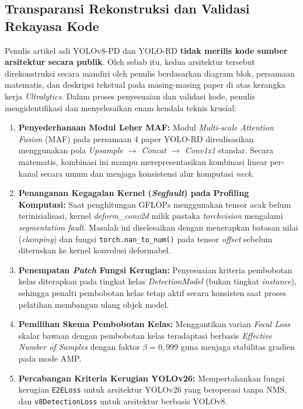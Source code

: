 \subsection{Transparansi Rekonstruksi dan Validasi Rekayasa Kode}
\label{subsec:validasi_kode}
Penulis artikel asli YOLOv8-PD \cite{Zeng2024} dan YOLO-RD \cite{Wang2025} \textbf{tidak merilis kode sumber arsitektur secara publik}. Oleh sebab itu, kedua arsitektur tersebut direkonstruksi secara mandiri oleh penulis berdasarkan diagram blok, persamaan matematis, dan deskripsi tekstual pada masing-masing paper di atas kerangka kerja \textit{Ultralytics}. Dalam proses penyesuaian dan validasi kode, penulis mengidentifikasi dan menyelesaikan enam kendala teknis krusial:
\begin{enumerate}
	\item \textbf{Penyederhanaan Modul Leher MAF:} Modul \textit{Multi-scale Attention Fusion} (MAF) pada persamaan 4 paper YOLO-RD direalisasikan menggunakan pola \textit{Upsample $\rightarrow$ Concat $\rightarrow$ Conv1x1} standar. Secara matematis, kombinasi ini mampu merepresentasikan kombinasi linear per-kanal secara umum dan menjaga konsistensi alur komputasi \textit{neck}.
	\item \textbf{Penanganan Kegagalan Kernel (\textit{Segfault}) pada Profiling Komputasi:} Saat penghitungan GFLOPs menggunakan tensor acak belum terinisialisasi, kernel \textit{deform\_conv2d} milik pustaka \textit{torchvision} mengalami \textit{segmentation fault}. Masalah ini diselesaikan dengan menerapkan batasan nilai (\textit{clamping}) dan fungsi \texttt{torch.nan\_to\_num()} pada tensor \textit{offset} sebelum diteruskan ke kernel konvolusi deformabel.
	\item \textbf{Penempatan \textit{Patch} Fungsi Kerugian:} Penyesuaian kriteria pembobotan kelas diterapkan pada tingkat kelas \textit{DetectionModel} (bukan tingkat \textit{instance}), sehingga penalti pembobotan kelas tetap aktif secara konsisten saat proses pelatihan membangun ulang objek model.
	\item \textbf{Pemilihan Skema Pembobotan Kelas:} Menggantikan varian \textit{Focal Loss} skalar bawaan dengan pembobotan kelas teradaptasi berbasis \textit{Effective Number of Samples} \cite{cui2019class} dengan faktor $\beta = 0,999$ guna menjaga stabilitas gradien pada mode AMP.
	\item \textbf{Percabangan Kriteria Kerugian YOLOv26:} Mempertahankan fungsi kerugian \texttt{E2ELoss} untuk arsitektur YOLOv26 yang beroperasi tanpa NMS, dan \texttt{v8DetectionLoss} untuk arsitektur berbasis YOLOv8.

\end{enumerate}
